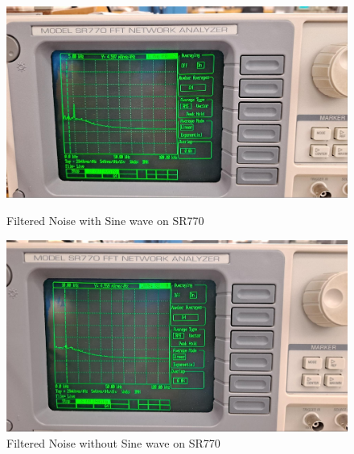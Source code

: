 \documentclass[../main.tex]{subfiles}
\begin{document}
\begin{figure}[ht]
    \centering
    \begin{minipage}{0.45\textwidth}
        \centering
        \includegraphics[width=\textwidth]{fig1_9.jpg}
        \caption{Filtered Noise with Sine wave on SR770}
        \label{fig:1.9}
    \end{minipage}\hfill
    \begin{minipage}{0.45\textwidth}
        \centering
        \includegraphics[width=\textwidth]{fig1_10.jpg}
        \caption{Filtered Noise without Sine wave on SR770}
        \label{fig:1.10}
    \end{minipage}
\end{figure}
\end{document}
